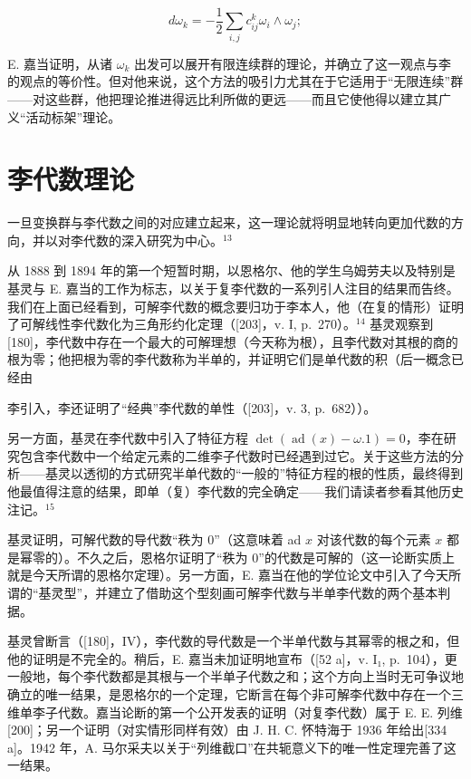 \[
d \omega_ {k} = - \frac {1}{2} \sum_ {i, j} c _ {i j} ^ {k} \omega_ {i} \wedge \omega_ {j};
\]

E. 嘉当证明，从诸 \(\omega_{k}\) 出发可以展开有限连续群的理论，并确立了这一观点与李的观点的等价性。但对他来说，这个方法的吸引力尤其在于它适用于“无限连续”群——对这些群，他把理论推进得远比利所做的更远——而且它使他得以建立其广义“活动标架”理论。

\section{李代数理论}

一旦变换群与李代数之间的对应建立起来，这一理论就将明显地转向更加代数的方向，并以对李代数的深入研究为中心。\(^{13}\)

从 1888 到 1894 年的第一个短暂时期，以恩格尔、他的学生乌姆劳夫以及特别是基灵与 E. 嘉当的工作为标志，以关于复李代数的一系列引人注目的结果而告终。我们在上面已经看到，可解李代数的概念要归功于李本人，他（在复的情形）证明了可解线性李代数化为三角形约化定理（{[}203{]}，v. I, p.~270）。\(^{14}\) 基灵观察到{[}180{]}，李代数中存在一个最大的可解理想（今天称为根），且李代数对其根的商的根为零；他把根为零的李代数称为半单的，并证明它们是单代数的积（后一概念已经由

李引入，李还证明了“经典”李代数的单性（{[}203{]}，v. 3, p.~682））。

另一方面，基灵在李代数中引入了特征方程 \(\det(\operatorname{ad}(x)-\omega.1)=0\)，李在研究包含李代数中一个给定元素的二维李子代数时已经遇到过它。关于这些方法的分析——基灵以透彻的方式研究半单代数的“一般的”特征方程的根的性质，最终得到他最值得注意的结果，即单（复）李代数的完全确定——我们请读者参看其他历史注记。\(^{15}\)

基灵证明，可解代数的导代数“秩为 0”（这意味着 ad \(x\) 对该代数的每个元素 \(x\) 都是幂零的）。不久之后，恩格尔证明了“秩为 0”的代数是可解的（这一论断实质上就是今天所谓的恩格尔定理）。另一方面，E. 嘉当在他的学位论文中引入了今天所谓的“基灵型”，并建立了借助这个型刻画可解李代数与半单李代数的两个基本判据。

基灵曾断言（{[}180{]}，IV），李代数的导代数是一个半单代数与其幂零的根之和，但他的证明是不完全的。稍后，E. 嘉当未加证明地宣布（{[}52 a{]}，v. I₁, p.~104），更一般地，每个李代数都是其根与一个半单子代数之和；这个方向上当时无可争议地确立的唯一结果，是恩格尔的一个定理，它断言在每个非可解李代数中存在一个三维单李子代数。嘉当论断的第一个公开发表的证明（对复李代数）属于 E. E. 列维{[}200{]}；另一个证明（对实情形同样有效）由 J. H. C. 怀特海于 1936 年给出{[}334 a{]}。1942 年，A. 马尔采夫以关于“列维截口”在共轭意义下的唯一性定理完善了这一结果。

